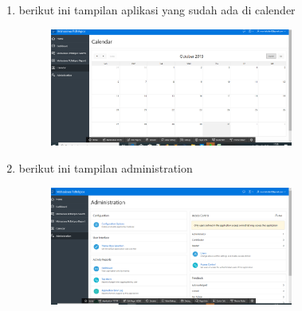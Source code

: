 \documentclass{article}
\begin{document}
\begin{enumerate}
\begin{figure}[h]
\end{figure}
\newpage\item berikut ini tampilan aplikasi yang sudah ada di calender
    \begin{figure}[h]
   \centerline{\includegraphics[width=8cm]{figure/capture4.png}}
\end{figure}
\item berikut ini tampilan administration
    \begin{figure}[h]
   \centerline{\includegraphics[width=8cm]{figure/capture5.png}}
\end{figure}
\end{enumerate}
\end{document}
